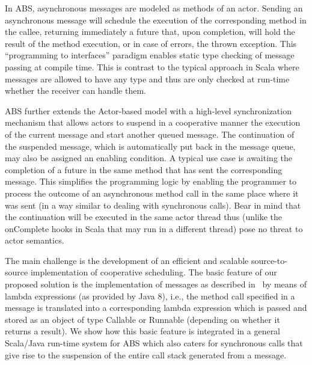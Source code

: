 \par In ABS, asynchronous messages are modeled as methods of an actor.
Sending an asynchronous message will schedule the execution of the corresponding method in the callee, returning immediately a future that, upon completion, will hold the result of the method execution, or in case of errors, the thrown exception.
This ``programming to interfaces'' paradigm enables static type checking of message passing at compile time.
This is contrast to the typical approach in Scala where messages are allowed to have any type and thus are only checked at run-time whether the receiver can handle them.

ABS further extends the Actor-based model with a high-level synchronization mechanism that allows actors to suspend in a cooperative manner the execution of the current message and start another queued message. 
The continuation of the suspended message, which is automatically put back in the message queue, may also be assigned an enabling condition. 
A typical use case is awaiting the completion of a future in the same method that has sent the corresponding message.
This simplifies the programming logic by enabling the programmer to process the outcome of an asynchronous method call in the same place where it was sent (in a way similar to dealing with synchronous calls).
Bear in mind that the continuation will be executed in the same actor thread thus (unlike the {\ttfamily onComplete} hooks in Scala that may run in a different thread) pose no threat to actor semantics.

The main challenge is the development of an efficient and scalable source-to-source implementation of cooperative scheduling. 
The basic feature of our proposed solution is the implementation of messages as described in~\cite{paj8} by means of lambda expressions (as provided by Java 8), i.e., the method call specified in a message
is translated into a corresponding lambda expression which is passed and stored as
an object of type Callable or Runnable (depending on whether it returns a result). We show how this basic feature is integrated in a general Scala/Java run-time system for ABS which also caters for synchronous calls that give rise to the suspension of the entire call stack generated from a message.

